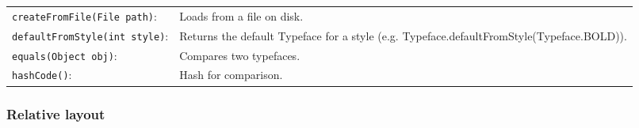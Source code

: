 \documentclass{report}
\begin{document}
\begin{itemize}
\begin{center}
\begin{tabular}{p{6cm}|p{6cm}}
                    \texttt{createFromFile(File path)}:	&Loads from a file on disk. \\[2ex]
                    \texttt{defaultFromStyle(int style)}:	&Returns the default Typeface for a style (e.g. Typeface.defaultFromStyle(Typeface.BOLD)). \\[2ex]
                    \texttt{equals(Object obj)}:	&Compares two typefaces. \\[2ex]
                    \texttt{hashCode()}:	&Hash for comparison.
                \end{tabular}
            \end{center}

    \end{itemize}

    \pagebreak 
    \subsubsection{Relative layout}
\end{document}

